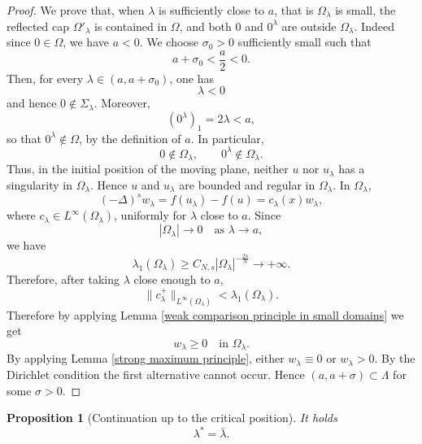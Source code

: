 \documentclass[11pt,a4paper]{article}
\newtheorem{proposition}[theorem]{Proposition}
\begin{document}
\begin{proof}
We prove that, when \(\lambda\) is sufficiently close to \(a\), that is \(\Omega_\lambda\) is small, the reflected cap \(\Omega'_{\lambda}\) is contained in \(\Omega\), and both \(0\) and \(0^\lambda\) are outside \(\Omega_\lambda\). Indeed since \(0\in\Omega\), we have \(a<0\). We choose
\(\sigma_0>0\) sufficiently small such that
\[
a+\sigma_0<\frac a2<0.
\]
Then, for every \(\lambda\in(a,a+\sigma_0)\), one has
\[
\lambda<0
\]
and hence \(0\notin\Sigma_\lambda\). Moreover,
\[
(0^\lambda)_1=2\lambda<a,
\]
so that \(0^\lambda\notin\Omega\), by the definition of \(a\). In particular,
\[
0\notin\Omega_\lambda,
\qquad
0^\lambda\notin\Omega_\lambda.
\]
Thus, in the initial position of the moving plane, neither \(u\) nor
\(u_\lambda\) has a singularity in \(\Omega_\lambda\).  Hence \(u\) and \(u_\lambda\) are bounded and regular in \(\Omega_\lambda\). In \(\Omega_\lambda\),
\[
(-\Delta)^s w_\lambda=f(u_\lambda)-f(u)=c_\lambda(x)w_\lambda,
\]
where \(c_\lambda\in L^\infty(\Omega_\lambda)\), uniformly for \(\lambda\) close to \(a\). Since
\[
|\Omega_\lambda|\to0\quad\text{as }\lambda\to a,
\]
we have
\[
\lambda_1(\Omega_\lambda)\ge C_{N,s}|\Omega_\lambda|^{-\frac{2s}{N}}\to+\infty.
\]
Therefore, after taking \(\lambda\) close enough to \(a\),
\[
\|c_\lambda^+\|_{L^\infty(\Omega_\lambda)}<\lambda_1(\Omega_\lambda).
\]
Therefore by applying Lemma \ref{weak comparison principle in small domains} we get
\[
w_\lambda\ge0\quad\text{in }\Omega_\lambda.
\]
By applying Lemma \ref{strong maximum principle}, either \(w_\lambda\equiv0\) or \(w_\lambda>0\). By the Dirichlet condition the first alternative cannot occur. Hence \((a,a+\sigma)\subset\Lambda\) for some \(\sigma>0\).
\end{proof}

\begin{proposition}[Continuation up to the critical position]\label{continuation}
It holds
\[
\lambda^*=\bar\lambda.
\]
\end{proposition}
\end{document}
